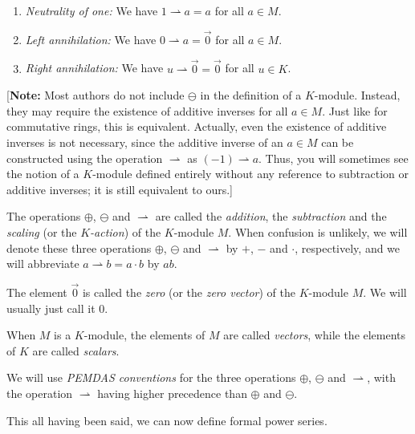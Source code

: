 \begin{definition}
\begin{enumerate}
\item \emph{Neutrality of one:} We have $1\rightharpoonup a=a$ for all $a\in
M$.

\item \emph{Left annihilation:} We have $0\rightharpoonup a=\overrightarrow{0}%
$ for all $a\in M$.

\item \emph{Right annihilation:} We have $u\rightharpoonup\overrightarrow{0}%
=\overrightarrow{0}$ for all $u\in K$.
\end{enumerate}

[\textbf{Note:} Most authors do not include $\ominus$ in the definition of a
$K$-module. Instead, they may require the existence of additive inverses for
all $a\in M$. Just like for commutative rings, this is equivalent. Actually,
even the existence of additive inverses is not necessary, since the additive
inverse of an $a\in M$ can be constructed using the operation $\rightharpoonup
$ as $\left(  -1\right)  \rightharpoonup a$. Thus, you will sometimes see the
notion of a $K$-module defined entirely without any reference to subtraction
or additive inverses; it is still equivalent to ours.]

The operations $\oplus$, $\ominus$ and $\rightharpoonup$ are called the
\emph{addition}, the \emph{subtraction} and the \emph{scaling} (or the
$K$\emph{-action}) of the $K$-module $M$. When confusion is unlikely, we will
denote these three operations $\oplus$, $\ominus$ and $\rightharpoonup$ by
$+$, $-$ and $\cdot$, respectively, and we will abbreviate $a\rightharpoonup
b=a\cdot b$ by $ab$.

The element $\overrightarrow{0}$ is called the \emph{zero} (or the \emph{zero
vector}) of the $K$-module $M$. We will usually just call it $0$.

When $M$ is a $K$-module, the elements of $M$ are called \emph{vectors}, while
the elements of $K$ are called \emph{scalars}.

We will use \emph{PEMDAS conventions} for the three operations $\oplus$,
$\ominus$ and $\rightharpoonup$, with the operation $\rightharpoonup$ having
higher precedence than $\oplus$ and $\ominus$.
\end{definition}

This all having been said, we can now define formal power series.

